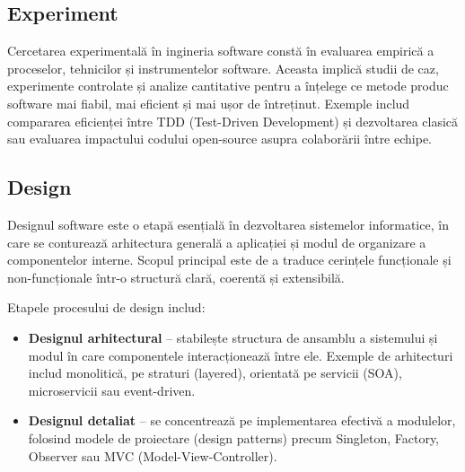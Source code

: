 \documentclass[12pt, letterpaper]{article}
\begin{document}
\subsection*{Experiment}
Cercetarea experimentală în ingineria software constă în evaluarea empirică a proceselor, tehnicilor și instrumentelor software. Aceasta implică studii de caz, experimente controlate și analize cantitative pentru a înțelege ce metode produc software mai fiabil, mai eficient și mai ușor de întreținut. Exemple includ compararea eficienței între TDD (Test-Driven Development) și dezvoltarea clasică sau evaluarea impactului codului open-source asupra colaborării între echipe.

\subsection*{Design}
Designul software este o etapă esențială în dezvoltarea sistemelor informatice, în care se conturează arhitectura generală a aplicației și modul de organizare a componentelor interne. Scopul principal este de a traduce cerințele funcționale și non-funcționale într-o structură clară, coerentă și extensibilă.

Etapele procesului de design includ:
\begin{itemize}
  \item \textbf{Designul arhitectural} – stabilește structura de ansamblu a sistemului și modul în care componentele interacționează între ele. Exemple de arhitecturi includ monolitică, pe straturi (layered), orientată pe servicii (SOA), microservicii sau event-driven.
  \item \textbf{Designul detaliat} – se concentrează pe implementarea efectivă a modulelor, folosind modele de proiectare (design patterns) precum Singleton, Factory, Observer sau MVC (Model-View-Controller).
\end{itemize}
\end{document}
